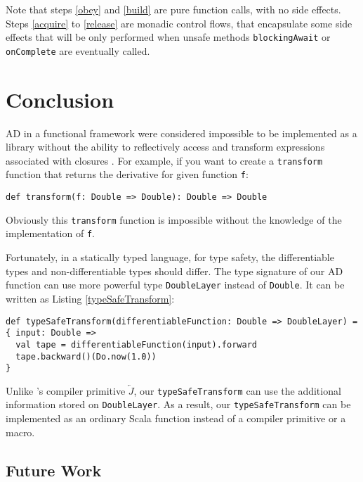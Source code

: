 Note that steps \ref{obey} and \ref{build} are pure function calls, with no side effects. Steps \ref{acquire} to \ref{release} are monadic control flows, that encapsulate some side effects that will be only performed when unsafe methods \lstinline{blockingAwait} or \lstinline{onComplete} are eventually called.

\section{Conclusion}

AD in a functional framework were considered impossible to be implemented as a library without the ability to reflectively access and
transform expressions associated with closures \cite{pearlmutter2008reverse}. For example, if you want to create a \lstinline{transform} function that returns the derivative for given function \lstinline{f}:

\begin{lstlisting}[float={htbp},caption={Impossible transform function for AD}, label={transform}]
def transform(f: Double => Double): Double => Double
\end{lstlisting}

Obviously this \lstinline{transform} function is impossible without the knowledge of the implementation of \lstinline{f}.

Fortunately, in a statically typed language, for type safety, the differentiable types and non-differentiable types should differ. The type signature of our AD function can use more powerful type \lstinline{DoubleLayer} instead of \lstinline{Double}. It can be written as Listing \ref{typeSafeTransform}:

\begin{lstlisting}[float={htbp},caption={Type safe transform function for AD}, label={typeSafeTransform}]
def typeSafeTransform(differentiableFunction: Double => DoubleLayer) = { input: Double =>
  val tape = differentiableFunction(input).forward
  tape.backward()(Do.now(1.0))
}
\end{lstlisting}

Unlike \cite{pearlmutter2008reverse}'s compiler primitive $\overleftarrow{J}$, our \lstinline{typeSafeTransform} can use the additional information stored on \lstinline{DoubleLayer}. As a result, our \lstinline{typeSafeTransform} can be implemented as an ordinary Scala function instead of a compiler primitive or a macro.


\subsection{Future Work}

\clearpage
\appendix

\printglossary

\begin{acks}
\end{acks}


